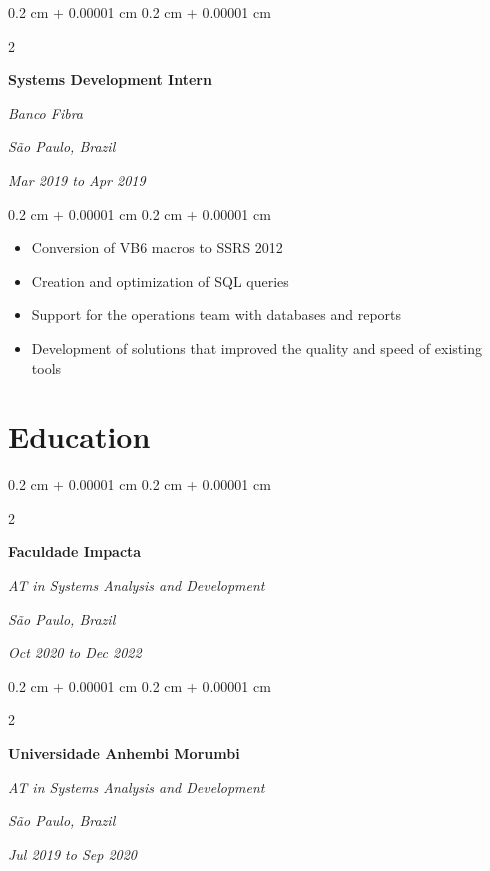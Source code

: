 \documentclass[10pt, a4paper]{article}
\newenvironment{highlights}{
    \begin{itemize}[
        topsep=0.10 cm,
        parsep=0.10 cm,
        partopsep=0pt,
        itemsep=0pt,
        leftmargin=0.4 cm + 10pt
    ]
}{
    \end{itemize}
} %
\newenvironment{onecolentry}{
    \begin{adjustwidth}{
        0.2 cm + 0.00001 cm
    }{
        0.2 cm + 0.00001 cm
    }
}{
    \end{adjustwidth}
} %
\newenvironment{twocolentry}[2][]{
    \onecolentry
    \def\secondColumn{#2}
    \setcolumnwidth{\fill, 7 cm}
    \begin{paracol}{2}
}{
    \switchcolumn \raggedleft \secondColumn
    \end{paracol}
    \endonecolentry
} %
\begin{document}
        \vspace{0.2 cm}

        \begin{twocolentry}{
        \textit{São Paulo, Brazil}    
            
        \textit{Mar 2019 to Apr 2019}}
            \textbf{Systems Development Intern}
            
            \textit{Banco Fibra}
        \end{twocolentry}

        \vspace{0.10 cm}
        \begin{onecolentry}
            \begin{highlights}
                \item Conversion of VB6 macros to SSRS 2012
                \item Creation and optimization of SQL queries
                \item Support for the operations team with databases and reports
                \item Development of solutions that improved the quality and speed of existing tools
            \end{highlights}
        \end{onecolentry}



    
    \section{Education}



        
        \begin{twocolentry}{
        \textit{São Paulo, Brazil}    
            
        \textit{Oct 2020 to Dec 2022}}
            \textbf{Faculdade Impacta}

            \textit{AT in Systems Analysis and Development}
        \end{twocolentry}



        \vspace{0.2 cm}

        \begin{twocolentry}{
        \textit{São Paulo, Brazil}    
            
        \textit{Jul 2019 to Sep 2020}}
            \textbf{Universidade Anhembi Morumbi}

            \textit{AT in Systems Analysis and Development}
        \end{twocolentry}
\end{document}
